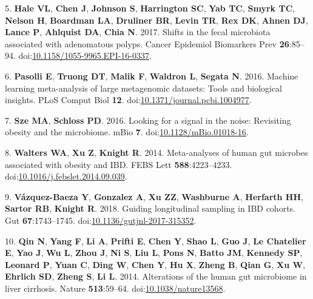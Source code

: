 \documentclass[11pt,]{article}
\begin{document}
\hypertarget{ref-hale_shifts_2017}{}
5. \textbf{Hale VL}, \textbf{Chen J}, \textbf{Johnson S},
\textbf{Harrington SC}, \textbf{Yab TC}, \textbf{Smyrk TC},
\textbf{Nelson H}, \textbf{Boardman LA}, \textbf{Druliner BR},
\textbf{Levin TR}, \textbf{Rex DK}, \textbf{Ahnen DJ}, \textbf{Lance P},
\textbf{Ahlquist DA}, \textbf{Chia N}. 2017. Shifts in the fecal
microbiota associated with adenomatous polyps. Cancer Epidemiol
Biomarkers Prev \textbf{26}:85--94.
doi:\href{https://doi.org/10.1158/1055-9965.EPI-16-0337}{10.1158/1055-9965.EPI-16-0337}.

\hypertarget{ref-pasolli_machine_2016}{}
6. \textbf{Pasolli E}, \textbf{Truong DT}, \textbf{Malik F},
\textbf{Waldron L}, \textbf{Segata N}. 2016. Machine learning
meta-analysis of large metagenomic datasets: Tools and biological
insights. PLoS Comput Biol \textbf{12}.
doi:\href{https://doi.org/10.1371/journal.pcbi.1004977}{10.1371/journal.pcbi.1004977}.

\hypertarget{ref-sze_looking_2016}{}
7. \textbf{Sze MA}, \textbf{Schloss PD}. 2016. Looking for a signal in
the noise: Revisiting obesity and the microbiome. mBio \textbf{7}.
doi:\href{https://doi.org/10.1128/mBio.01018-16}{10.1128/mBio.01018-16}.

\hypertarget{ref-walters_meta-analyses_2014}{}
8. \textbf{Walters WA}, \textbf{Xu Z}, \textbf{Knight R}. 2014.
Meta-analyses of human gut microbes associated with obesity and IBD.
FEBS Lett \textbf{588}:4223--4233.
doi:\href{https://doi.org/10.1016/j.febslet.2014.09.039}{10.1016/j.febslet.2014.09.039}.

\hypertarget{ref-vazquez-baeza_guiding_2018}{}
9. \textbf{Vázquez-Baeza Y}, \textbf{Gonzalez A}, \textbf{Xu ZZ},
\textbf{Washburne A}, \textbf{Herfarth HH}, \textbf{Sartor RB},
\textbf{Knight R}. 2018. Guiding longitudinal sampling in IBD cohorts.
Gut \textbf{67}:1743--1745.
doi:\href{https://doi.org/10.1136/gutjnl-2017-315352}{10.1136/gutjnl-2017-315352}.

\hypertarget{ref-qin_alterations_2014}{}
10. \textbf{Qin N}, \textbf{Yang F}, \textbf{Li A}, \textbf{Prifti E},
\textbf{Chen Y}, \textbf{Shao L}, \textbf{Guo J}, \textbf{Le Chatelier
E}, \textbf{Yao J}, \textbf{Wu L}, \textbf{Zhou J}, \textbf{Ni S},
\textbf{Liu L}, \textbf{Pons N}, \textbf{Batto JM}, \textbf{Kennedy SP},
\textbf{Leonard P}, \textbf{Yuan C}, \textbf{Ding W}, \textbf{Chen Y},
\textbf{Hu X}, \textbf{Zheng B}, \textbf{Qian G}, \textbf{Xu W},
\textbf{Ehrlich SD}, \textbf{Zheng S}, \textbf{Li L}. 2014. Alterations
of the human gut microbiome in liver cirrhosis. Nature
\textbf{513}:59--64.
doi:\href{https://doi.org/10.1038/nature13568}{10.1038/nature13568}.
\end{document}
